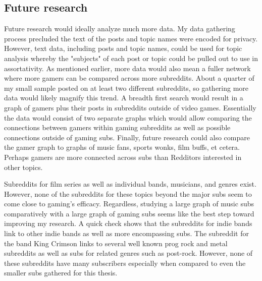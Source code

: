 \documentclass[12pt, a4paper]{article}
\begin{document}
\subsection{Future research}
Future research would ideally analyze much more data. My data gathering process precluded the text of the posts and topic names were encoded for privacy. However, text data, including posts and topic names, could be used for topic analysis whereby the "subjects" of each post or topic could be pulled out to use in assortativity. As mentioned earlier, more data would also mean a fuller network where more gamers can be compared across more subreddits. About a quarter of my small sample posted on at least two different subreddits, so gathering more data would likely magnify this trend. A breadth first search would result in a graph of gamers plus their posts in subreddits outside of video games. Essentially the data would consist of two separate graphs which would allow comparing the connections between gamers within gaming subreddits as well as possible connections outside of gaming subs. Finally, future research could also compare the gamer graph to graphs of music fans, sports wonks, film buffs, et cetera. Perhaps gamers are more connected across subs than Redditors interested in other topics.

Subreddits for film series as well as individual bands, musicians, and genres exist. However, none of the subreddits for these topics beyond the major subs seem to come close to gaming's efficacy. Regardless, studying a large graph of music subs comparatively with a large graph of gaming subs seems like the best step toward improving my research. A quick check shows that the subreddits for indie bands link to other indie bands as well as more encompassing subs. The subreddit for the band King Crimson links to several well known prog rock and metal subreddits as well as subs for related genres such as post-rock. However, none of these subreddits have many subscribers especially when compared to even the smaller subs gathered for this thesis.

\printbibliography
\end{document}
